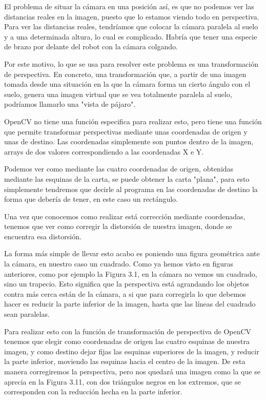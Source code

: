 El problema de situar la cámara en una posición así, es que no podemos ver las distancias reales en la imagen, puesto que lo estamos viendo todo en perspectiva. Para ver las distancias reales, tendríamos que colocar la cámara paralela al suelo y a una determinada altura, lo cual es complicado. Habría que tener una especie de brazo por delante del robot con la cámara colgando.

Por este motivo, lo que se usa para resolver este problema es una transformación de perspectiva. En concreto, una transformación que, a partir de una imagen tomada desde una situación en la que la cámara forma un cierto ángulo con el suelo, genera una imagen virtual que se vea totalmente paralela al suelo, podríamos llamarlo una "vista de pájaro".


OpenCV no tiene una función especifica para realizar esto, pero tiene una función que permite transformar perspectivas mediante unas coordenadas de origen y unas de destino\cite{persp_trans}. Las coordenadas simplemente son puntos dentro de la imagen, arrays de dos valores correspondiendo a las coordenadas X e Y.


Podemos ver como mediante las cuatro coordenadas de origen, obtenidas mediante las esquinas de la carta, se puede obtener la carta "plana", para esto simplemente tendremos que decirle al programa en las coordenadas de destino la forma que debería de tener, en este caso un rectángulo.

Una vez que conocemos como realizar está corrección mediante coordenadas, tenemos que ver como corregir la distorsión de nuestra imagen, donde se encuentra esa distorsión.

La forma más simple de llevar esto acabo es poniendo una figura geométrica ante la cámara, en nuestro caso un cuadrado. Como ya hemos visto en figuras anteriores, como por ejemplo la Figura 3.1, en la cámara no vemos un cuadrado, sino un trapecio. Esto significa que la perspectiva está agrandando los objetos contra más cerca están de la cámara, a si que para corregirla lo que debemos hacer es reducir la parte inferior de la imagen, hasta que las líneas del cuadrado sean paralelas.

Para realizar esto con la función de transformación de perspectiva de OpenCV tenemos que elegir como coordenadas de origen las cuatro esquinas de nuestra imagen, y como destino dejar fijas las esquinas superiores de la imagen, y reducir la parte inferior, moviendo las esquinas hacia el centro de la imagen\cite{coord_persp}. De esta manera corregiremos la perspectiva, pero nos quedará una imagen como la que se aprecia en la Figura 3.11, con dos triángulos negros en los extremos, que se corresponden con la reducción hecha en la parte inferior. 

